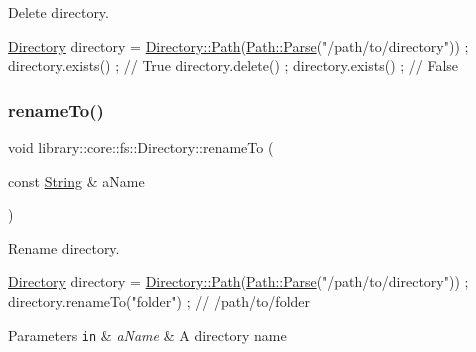 Delete directory. 


\begin{DoxyCode}
\hyperlink{classlibrary_1_1core_1_1fs_1_1_directory_a3ec39f6cad19a81d520e9a1f2d8bb1f7}{Directory} directory = \hyperlink{classlibrary_1_1core_1_1fs_1_1_directory_ae906e33e4659219cf296dd314c7726b8}{Directory::Path}(\hyperlink{classlibrary_1_1core_1_1fs_1_1_path_a6ba644b6609507e724c217bf2020f5ae}{Path::Parse}(\textcolor{stringliteral}{"/path/to/directory"}))
       ;
directory.exists() ; \textcolor{comment}{// True}
directory.delete() ;
directory.exists() ; \textcolor{comment}{// False}
\end{DoxyCode}
 \mbox{\label{classlibrary_1_1core_1_1fs_1_1_directory_a895ac94a625098aa05a2239cfaf5359b}} 
\subsubsection{\texorpdfstring{rename\+To()}{renameTo()}}
{\footnotesize\ttfamily void library\+::core\+::fs\+::\+Directory\+::rename\+To (\begin{DoxyParamCaption}\item[{const \hyperlink{classlibrary_1_1core_1_1types_1_1_string}{String} \&}]{a\+Name }\end{DoxyParamCaption})}



Rename directory. 


\begin{DoxyCode}
\hyperlink{classlibrary_1_1core_1_1fs_1_1_directory_a3ec39f6cad19a81d520e9a1f2d8bb1f7}{Directory} directory = \hyperlink{classlibrary_1_1core_1_1fs_1_1_directory_ae906e33e4659219cf296dd314c7726b8}{Directory::Path}(\hyperlink{classlibrary_1_1core_1_1fs_1_1_path_a6ba644b6609507e724c217bf2020f5ae}{Path::Parse}(\textcolor{stringliteral}{"/path/to/directory"}))
       ;
directory.renameTo(\textcolor{stringliteral}{"folder"}) ; \textcolor{comment}{// /path/to/folder}
\end{DoxyCode}



\begin{DoxyParams}[1]{Parameters}
\mbox{\tt in}  & {\em a\+Name} & A directory name \\
\hline
\end{DoxyParams}
\mbox{\label{classlibrary_1_1core_1_1fs_1_1_directory_a617eb0d4858dd8e2b69a6c5e7b645d8c}} 
